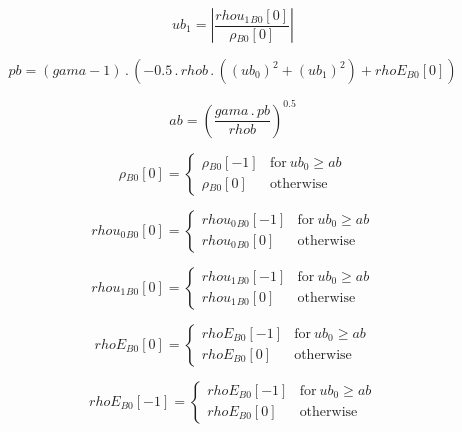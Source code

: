 \documentclass{article}
\begin{document}
\begin{dmath}ub_{1} = \left|{\frac{{rhou_{1}{_{B0}}}[{0}]}{{\rho{_{B0}}}[{0}]}}\right|\end{dmath}

\begin{dmath}pb = \left(gama - 1\right) \,.\, \left(- 0.5 \,.\, rhob \,.\, \left(\left(ub_{0} \right)^{2} + \left(ub_{1} \right)^{2}\right) + {rhoE{_{B0}}}[{0}]\right)\end{dmath}

\begin{dmath}ab = \left(\frac{gama \,.\, pb}{rhob} \right)^{0.5}\end{dmath}

\begin{dmath}{\rho{_{B0}}}[{0}] = \begin{cases} {\rho{_{B0}}}[{-1}] & \text{for}\: ub_{0} \geq ab \\{\rho{_{B0}}}[{0}] & \text{otherwise} \end{cases}\end{dmath}

\begin{dmath}{rhou_{0}{_{B0}}}[{0}] = \begin{cases} {rhou_{0}{_{B0}}}[{-1}] & \text{for}\: ub_{0} \geq ab \\{rhou_{0}{_{B0}}}[{0}] & \text{otherwise} \end{cases}\end{dmath}

\begin{dmath}{rhou_{1}{_{B0}}}[{0}] = \begin{cases} {rhou_{1}{_{B0}}}[{-1}] & \text{for}\: ub_{0} \geq ab \\{rhou_{1}{_{B0}}}[{0}] & \text{otherwise} \end{cases}\end{dmath}

\begin{dmath}{rhoE{_{B0}}}[{0}] = \begin{cases} {rhoE{_{B0}}}[{-1}] & \text{for}\: ub_{0} \geq ab \\{rhoE{_{B0}}}[{0}] & \text{otherwise} \end{cases}\end{dmath}

\begin{dmath}{rhoE{_{B0}}}[{-1}] = \begin{cases} {rhoE{_{B0}}}[{-1}] & \text{for}\: ub_{0} \geq ab \\{rhoE{_{B0}}}[{0}] & \text{otherwise} \end{cases}\end{dmath}
\end{document}
